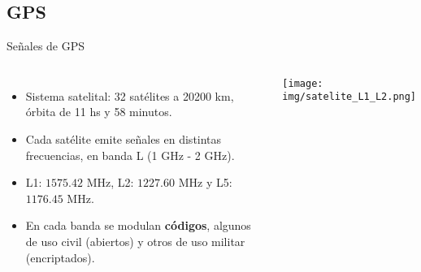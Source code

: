 \subsection{GPS}

\begin{frame}{Señales de GPS}
\begin{columns}
        \begin{itemize}
            \item<2-> Sistema satelital: 32 satélites a 20200 km, órbita de 11 hs y 58 minutos.
            \item<3-> Cada satélite emite señales en distintas frecuencias, en banda L (1 GHz - 2 GHz).
            \item<4-> L1: $1575.42$ MHz, L2: $1227.60$ MHz y L5: $1176.45$ MHz.
            \item<5-> En cada banda se modulan \textbf{códigos}, algunos de uso civil (abiertos) y otros de uso militar (encriptados).
        \end{itemize}

        \texttt{[image: img/satelite\_L1\_L2.png]}
        
\end{columns}    
\end{frame}

